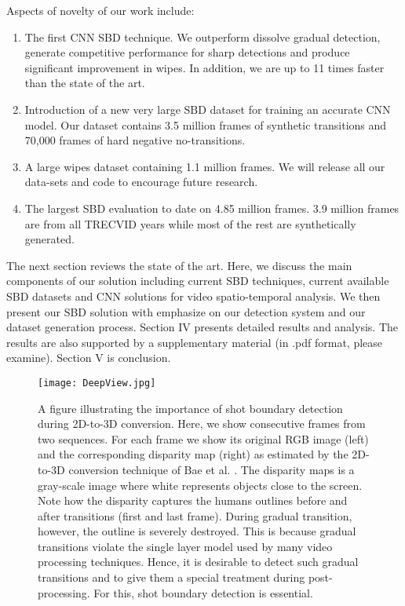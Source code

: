\documentclass[journal]{IEEEtran}
\begin{document}
Aspects of novelty of our work include:
\begin{enumerate}
\item The first CNN SBD technique. We outperform dissolve gradual detection, generate competitive performance for sharp detections and produce significant improvement in wipes. In addition, we are up to 11 times faster than the state of the art.
\item Introduction of a new very large SBD dataset for training an accurate CNN model. Our dataset contains 3.5 million frames of synthetic transitions and 70,000 frames of hard negative no-transitions.
\item A large wipes dataset containing 1.1 million frames. We will release all our data-sets and code to encourage future research.
\item The largest SBD evaluation to date on 4.85 million frames. 3.9 million frames are from all TRECVID years \cite{Smeaton10} while most of the rest are synthetically generated.  
\end{enumerate}

The next section reviews the state of the art. Here, we discuss the main components of our solution including current SBD techniques, current available SBD datasets and CNN solutions for video spatio-temporal analysis. We then present our SBD solution with emphasize on our detection system and our dataset generation process. Section IV presents detailed results and analysis. The results are also supported by a supplementary material (in .pdf format, please examine). Section V is conclusion.   





\begin{figure}
  \centering
   \texttt{[image: DeepView.jpg]}
   \caption{A figure illustrating the importance of shot boundary detection during 2D-to-3D conversion. Here, we show consecutive frames from two sequences. For each frame we show its original RGB image (left) and the corresponding disparity map (right) as estimated by the 2D-to-3D conversion technique of Bae et al. \cite{Bae17}. The disparity maps is a gray-scale image where white represents objects close to the screen. Note how the disparity captures the humans outlines before and after transitions (first and last frame). During gradual transition, however, the outline is severely destroyed. This is because gradual transitions violate the single layer model used by many video processing techniques. Hence, it is desirable to detect such gradual transitions and to give them a special treatment during post-processing. For this, shot boundary detection is essential.}
\label{fig:DeepView}
 \end{figure}
\end{document}
